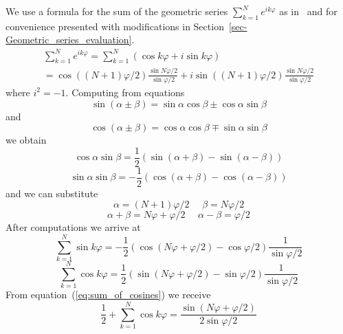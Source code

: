 \documentclass[12pt]{amsart}
\theoremstyle{definition}
\numberwithin{equation}{section}
\begin{document}
We use a formula for the sum of the geometric series $\sum_{k=1}^{N} e^{i k \varphi}$ as in~\cite{kn:Hirst_Book}
and for convenience presented with modifications in Section~\ref{sec-Geometric_series_evaluation}\@.
\begin{eqnarray}
\sum_{k=1}^{N} e^{i k \varphi}
=
\sum_{k=1}^{N} (\cos k \varphi + i \sin k \varphi)         \\ \nonumber
=
\cos((N+1) \varphi/2) \frac{\sin N \varphi/2}{\sin \varphi/2} + i \sin((N+1) \varphi/2) \frac{\sin N \varphi/2}{\sin \varphi/2}
\end{eqnarray}
where $i^2=-1$\@.
Computing from equations
\begin{equation}
\sin(\alpha \pm \beta) = \sin \alpha \cos \beta \pm \cos \alpha \sin \beta
\end{equation}
and
\begin{equation}
\cos(\alpha \pm \beta) = \cos \alpha \cos \beta \mp \sin \alpha \sin \beta
\end{equation}
we obtain
\begin{equation}
\cos \alpha \sin \beta = \frac{1}{2}(\sin(\alpha + \beta) - \sin(\alpha - \beta))
\end{equation}
\begin{equation}
\sin \alpha \sin \beta = - \frac{1}{2}(\cos(\alpha + \beta) - \cos(\alpha - \beta))
\end{equation}
and we can substitute
\begin{equation}
\alpha = (N+1)\varphi/2 \,\,\,\,\,\,\,\, \beta=N \varphi/2
\end{equation}
\begin{equation}
\alpha + \beta = N\varphi+\varphi/2 \,\,\,\,\,\,\,\, \alpha - \beta = \varphi/2
\end{equation}
After computations we arrive at
\begin{equation}
\sum_{k=1}^{N} \sin k \varphi = -\frac{1}{2} ( \cos(N\varphi+\varphi/2) - \cos \varphi/2 ) \frac{1}{\sin \varphi/2}
\end{equation}
\begin{equation}
\label{eq:sum_of_cosines}
\sum_{k=1}^{N} \cos k \varphi = \frac{1}{2} ( \sin(N\varphi+\varphi/2) - \sin \varphi/2 ) \frac{1}{\sin \varphi/2}
\end{equation}
From equation~(\ref{eq:sum_of_cosines}) we receive
\begin{equation}
\label{eq:Sum_of_cos}
\frac{1}{2} + \sum_{k=1}^{N} \cos k \varphi 
=
\frac{\sin(N\varphi+\varphi/2)}{2 \sin \varphi/2}
\end{equation}
\end{document}
